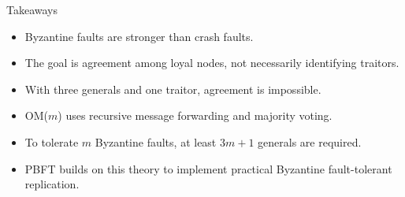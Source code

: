 \documentclass[aspectratio=169]{beamer}
\begin{document}
\begin{frame}{Takeaways}

\begin{itemize}
  \item Byzantine faults are stronger than crash faults.
  \item The goal is agreement among loyal nodes, not necessarily identifying traitors.
  \item With three generals and one traitor, agreement is impossible.
  \item OM($m$) uses recursive message forwarding and majority voting.
  \item To tolerate $m$ Byzantine faults, at least $3m+1$ generals are required.
  \item PBFT builds on this theory to implement practical Byzantine fault-tolerant replication.
\end{itemize}

\end{frame}
\end{document}
